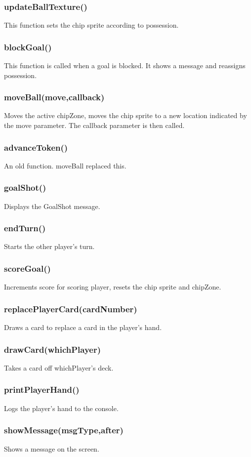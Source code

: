 \documentclass[12pt]{article}
\begin{document}
\subsubsection*{updateBallTexture()}
This function sets the chip sprite according to possession. 
\subsubsection*{blockGoal()}
This function is called when a goal is blocked. It shows a message
and reassigns possession.
\subsubsection*{moveBall(move,callback)}
Moves the active chipZone, moves the chip sprite to a new location
indicated by the move parameter. The callback parameter is then
 called. 
\subsubsection*{advanceToken()}
An old function. moveBall replaced this. 
\subsubsection*{goalShot()}
Displays the GoalShot message. 
\subsubsection*{endTurn()}
Starts the other player's turn. 
\subsubsection*{scoreGoal()}
Increments score for scoring player, resets the chip sprite and 
chipZone. 
\subsubsection*{replacePlayerCard(cardNumber)}
Draws a card to replace a card in the player's hand.
\subsubsection*{drawCard(whichPlayer)}
Takes a card off whichPlayer's deck.
\subsubsection*{printPlayerHand()}
Logs the player's hand to the console.
\subsubsection*{showMessage(msgType,after)}
Shows a message on the screen.
\end{document}

